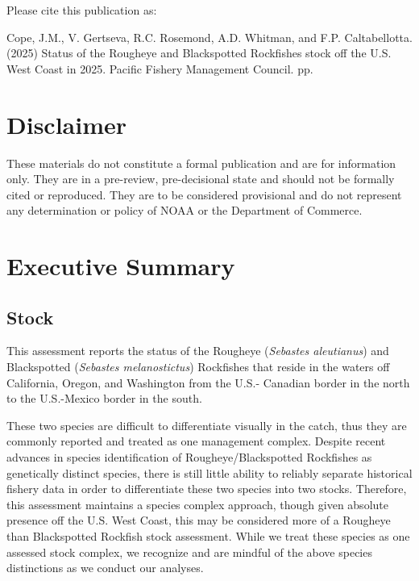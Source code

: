 \documentclass[
]{scrartcl}
\renewcommand*\contentsname{Table of contents}
\newcommand\contentsname{Table of contents}
\begin{document}
\renewcommand*\contentsname{Table of contents}
{
\hypersetup{linkcolor=}
\setcounter{tocdepth}{3}
\tableofcontents
}

\newpage{}

Please cite this publication as:

Cope, J.M., V. Gertseva, R.C. Rosemond, A.D. Whitman, and F.P.
Caltabellotta. (2025) Status of the Rougheye and Blackspotted Rockfishes
stock off the U.S. West Coast in 2025. Pacific Fishery Management
Council. \pageref*{LastPage}{} pp.

\newpage{}

\section*{Disclaimer}\label{disclaimer}

These materials do not constitute a formal publication and are for
information only. They are in a pre-review, pre-decisional state and
should not be formally cited or reproduced. They are to be considered
provisional and do not represent any determination or policy of NOAA or
the Department of Commerce.

\newpage{}

\setcounter{page}{1}

\renewcommand{\thetable}{\roman{table}}
\renewcommand{\thefigure}{\roman{figure}}

\setlength\parskip{0.5em plus 0.1em minus 0.2em}

\section{Executive Summary}\label{executive-summary}

\subsection{Stock}\label{stock}

This assessment reports the status of the Rougheye (\emph{Sebastes
aleutianus}) and Blackspotted (\emph{Sebastes melanostictus}) Rockfishes
that reside in the waters off California, Oregon, and Washington from
the U.S.- Canadian border in the north to the U.S.-Mexico border in the
south.

These two species are difficult to differentiate visually in the catch,
thus they are commonly reported and treated as one management complex.
Despite recent advances in species identification of
Rougheye/Blackspotted Rockfishes as genetically distinct species, there
is still little ability to reliably separate historical fishery data in
order to differentiate these two species into two stocks. Therefore,
this assessment maintains a species complex approach, though given
absolute presence off the U.S. West Coast, this may be considered more
of a Rougheye than Blackspotted Rockfish stock assessment. While we
treat these species as one assessed stock complex, we recognize and are
mindful of the above species distinctions as we conduct our analyses.
\end{document}
